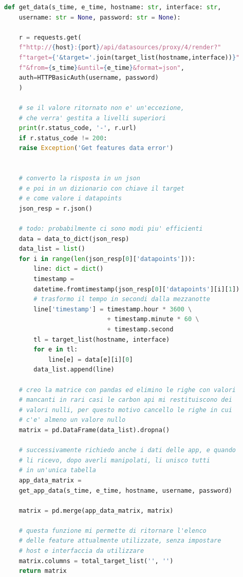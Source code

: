 \begin{lstlisting}[language=Python, label={code:get_data}, caption={Funzione usata per scaricare i dati dal server}]
def get_data(s_time, e_time, hostname: str, interface: str,
    username: str = None, password: str = None):

    r = requests.get(
    f"http://{host}:{port}/api/datasources/proxy/4/render?"
    f"target={'&target='.join(target_list(hostname,interface))}"
    f"&from={s_time}&until={e_time}&format=json",
    auth=HTTPBasicAuth(username, password)
    )

    # se il valore ritornato non e' un'eccezione,
    # che verra' gestita a livelli superiori
    print(r.status_code, '-', r.url)
    if r.status_code != 200:
    raise Exception('Get features data error')


    # converto la risposta in un json 
    # e poi in un dizionario con chiave il target
    # e come valore i datapoints
    json_resp = r.json()

    # todo: probabilmente ci sono modi piu' efficienti
    data = data_to_dict(json_resp)
    data_list = list()
    for i in range(len(json_resp[0]['datapoints'])):
        line: dict = dict()
        timestamp =
        datetime.fromtimestamp(json_resp[0]['datapoints'][i][1])
        # trasformo il tempo in secondi dalla mezzanotte
        line['timestamp'] = timestamp.hour * 3600 \
                            + timestamp.minute * 60 \
                            + timestamp.second
        tl = target_list(hostname, interface)
        for e in tl:
            line[e] = data[e][i][0]
        data_list.append(line)

    # creo la matrice con pandas ed elimino le righe con valori
    # mancanti in rari casi le carbon api mi restituiscono dei
    # valori nulli, per questo motivo cancello le righe in cui
    # c'e' almeno un valore nullo
    matrix = pd.DataFrame(data_list).dropna()

    # successivamente richiedo anche i dati delle app, e quando
    # li ricevo, dopo averli manipolati, li unisco tutti
    # in un'unica tabella
    app_data_matrix =
    get_app_data(s_time, e_time, hostname, username, password)

    matrix = pd.merge(app_data_matrix, matrix)

    # questa funzione mi permette di ritornare l'elenco 
    # delle feature attualmente utilizzate, senza impostare
    # host e interfaccia da utilizzare
    matrix.columns = total_target_list('', '')
    return matrix

\end{lstlisting}

